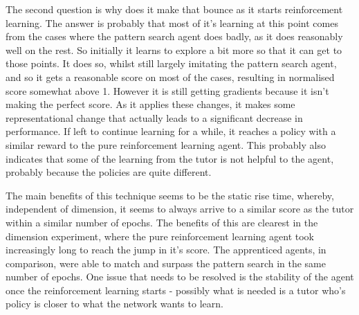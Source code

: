 The second question is why does it make that bounce as it starts reinforcement learning. The answer is probably that most of it's learning at this point comes from the cases where the pattern search agent does badly, as it does reasonably well on the rest. So initially it learns to explore a bit more so that it can get to those points. It does so, whilst still largely imitating the pattern search agent, and so it gets a reasonable score on most of the cases, resulting in normalised score somewhat above 1. However it is still getting gradients because it isn't making the perfect score. As it applies these changes, it makes some representational change that actually leads to a significant decrease in performance. If left to continue learning for a while, it reaches a policy with a similar reward to the pure reinforcement learning agent. This probably also indicates that some of the learning from the tutor is not helpful to the agent, probably because the policies are quite different.

The main benefits of this technique seems to be the static rise time, whereby, independent of dimension, it seems to always arrive to a similar score as the tutor within a similar number of epochs. The benefits of this are clearest in the dimension experiment, where the pure reinforcement learning agent took increasingly long to reach the jump in it's score. The apprenticed agents, in comparison, were able to match and surpass the pattern search in the same number of epochs. One issue that needs to be resolved is the stability of the agent once the reinforcement learning starts - possibly what is needed is a  tutor who's policy is closer to what the network wants to learn.

